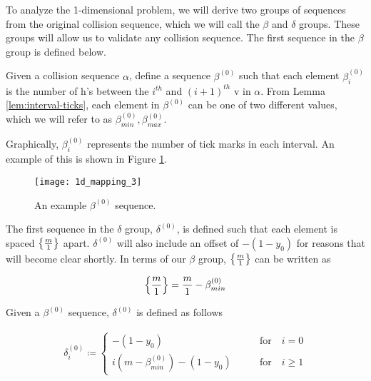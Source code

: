 
To analyze the 1-dimensional problem, we will derive two groups of sequences from the original collision sequence, which we will call the $\beta$ and $\delta$ groups. These groups will allow us to validate any collision sequence. The first sequence in the $\beta$ group is defined below.

\begin{definition}
	Given a collision sequence $\alpha$, define a sequence $\beta^{(0)}$ such that each element $\beta^{(0)}_i$ is the number of h's between the $i^{th}$ and $(i+1)^{th}$ v in $\alpha$. From Lemma \ref{lem:interval-ticks}, each element in $\beta^{(0)}$ can be one of two different values, which we will refer to as $\beta^{(0)}_{min}, \beta^{(0)}_{max}$.
\end{definition}

Graphically, $\beta^{(0)}_i$ represents the number of tick marks in each interval. An example of this is shown in Figure \ref{fig:beta-sequence}.

\begin{figure}[H]
  \begin{center}
    \texttt{[image: 1d\_mapping\_3]}
  \end{center}
  \vspace{-.2in} %
  \caption{\label{fig:beta-sequence} An example $\beta^{(0)}$ sequence.}
\end{figure}

The first sequence in the $\delta$ group, $\delta^{(0)}$, is defined such that each element is spaced $\cbracket{\frac{m}{1}}$ apart. $\delta^{(0)}$ will also include an offset of $-(1-y_0)$ for reasons that will become clear shortly. In terms of our $\beta$ group, $\cbracket{\frac{m}{1}}$ can be written as 

\begin{equation}
  \cbracket{\frac{m}{1}} = \frac{m}{1} - \beta^{(0)}_{min}
\end{equation}

\begin{definition}
  Given a $\beta^{(0)}$ sequence, $\delta^{(0)}$ is defined as follows

  \begin{align}\label{delta_beta}
    \delta^{(0)}_i \coloneqq \begin{cases}
      -(1-y_0) \qquad &\text{for} \quad i = 0\\
      i (m - \beta^{(0)}_{min}) - (1-y_0) \qquad &\text{for} \quad i \ge 1
    \end{cases}
  \end{align}
\end{definition}


